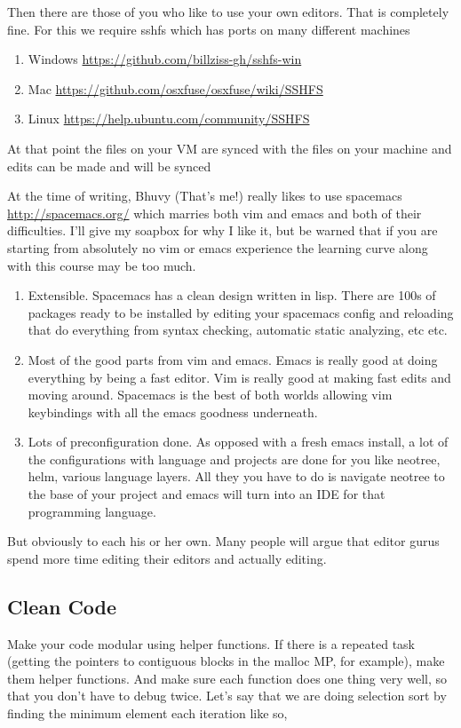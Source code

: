 Then there are those of you who like to use your own editors. That is completely fine.
For this we require sshfs which has ports on many different machines
\begin{enumerate}
\item Windows \url{https://github.com/billziss-gh/sshfs-win}
\item Mac \url{https://github.com/osxfuse/osxfuse/wiki/SSHFS}
\item Linux \url{https://help.ubuntu.com/community/SSHFS}
\end{enumerate}
At that point the files on your VM are synced with the files on your machine and edits can be made and will be synced

At the time of writing, Bhuvy (That's me!) really likes to use spacemacs \url{http://spacemacs.org/} which marries both vim and emacs and both of their difficulties.
I'll give my soapbox for why I like it, but be warned that if you are starting from absolutely no vim or emacs experience the learning curve along with this course may be too much.
\begin{enumerate}
\item Extensible. Spacemacs has a clean design written in lisp. There are 100s of packages ready to be installed by editing your spacemacs config and reloading that do everything from syntax checking, automatic static analyzing, etc etc.
\item Most of the good parts from vim and emacs. Emacs is really good at doing everything by being a fast editor. Vim is really good at making fast edits and moving around. Spacemacs is the best of both worlds allowing vim keybindings with all the emacs goodness underneath.
\item Lots of preconfiguration done. As opposed with a fresh emacs install, a lot of the configurations with language and projects are done for you like neotree, helm, various language layers. All they you have to do is navigate neotree to the base of your project and emacs will turn into an IDE for that programming language.
\end{enumerate}

But obviously to each his or her own. Many people will argue that editor gurus spend more time editing their editors and actually editing.

\subsection{Clean Code}

Make your code modular using helper functions. If there is a repeated task (getting the pointers to contiguous blocks in the malloc MP, for example), make them helper functions.
And make sure each function does one thing very well, so that you don't have to debug twice.
Let's say that we are doing selection sort by finding the minimum element each iteration like so,

